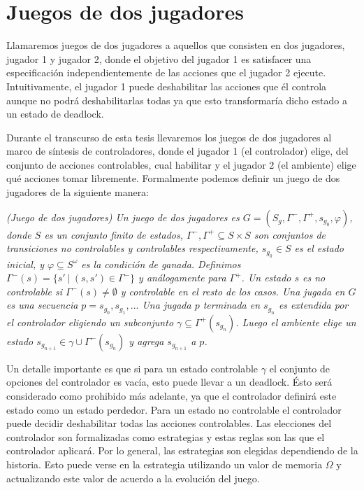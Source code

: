 \section{Juegos de dos jugadores}

Llamaremos juegos de dos jugadores a aquellos que consisten en dos jugadores, jugador 1 y jugador 2, donde el objetivo
del jugador 1 es satisfacer una especificación independientemente de las acciones que el jugador 2 ejecute.
Intuitivamente, el jugador 1 puede deshabilitar las acciones que él controla aunque no podrá deshabilitarlas todas ya
que esto transformaría dicho estado a un estado de deadlock.

Durante el transcurso de esta tesis llevaremos los juegos de dos jugadores al marco de síntesis de controladores, donde
el jugador 1 (el controlador) elige, del conjunto de acciones controlables, cual habilitar y el jugador 2 (el ambiente)
elige qué acciones tomar libremente. Formalmente podemos definir un juego de dos jugadores de la siguiente manera:

\begin{nahaDef}
    \emph{(Juego de dos jugadores) Un juego de dos jugadores es $G = (S_g, \Gamma^-, \Gamma^+, s_{g_0}, \varphi)$, donde
    $S$ es un conjunto finito de estados, $\Gamma^-, \Gamma^+ \subseteq S \times S$ son conjuntos de transiciones no
    controlables y controlables respectivamente, $s_{g_0} \in S$ es el estado inicial, y $\varphi \subseteq S^\omega$ es
    la condición de ganada. Definimos $\Gamma^-(s) = \{s'\ |\ (s,s') \in \Gamma^-\}$ y análogamente para $\Gamma^+$. Un
    estado $s$ es no controlable si $\Gamma^-(s) \neq \emptyset$ y controlable en el resto de los casos. Una jugada en
    $G$ es una secuencia $p = s_{g_0}, s_{g_1},...$ Una jugada $p$ terminada en $s_{g_n}$ es extendida por el
    controlador eligiendo un subconjunto $\gamma \subseteq \Gamma^+(s_{g_n})$. Luego el ambiente elige un estado
    $s_{g_{n+1}} \in \gamma \cup \Gamma^-(s_{g_n})$ y agrega $s_{g_{n+1}}$ a $p$.}
\end{nahaDef}

Un detalle importante es que si para un estado controlable $\gamma$ el conjunto de opciones del controlador es vacía, esto
puede llevar a un deadlock. Ésto será considerado como prohibido más adelante, ya que el controlador definirá este estado
como un estado perdedor. Para un estado no controlable el controlador puede decidir deshabilitar todas las acciones
controlables. Las elecciones del controlador son formalizadas como estrategias y estas reglas son las que el controlador
aplicará. Por lo general, las estrategias son elegidas dependiendo de la historia. Esto puede verse en la estrategia
utilizando un valor de memoria $\Omega$ y actualizando este valor de acuerdo a la evolución del juego.

